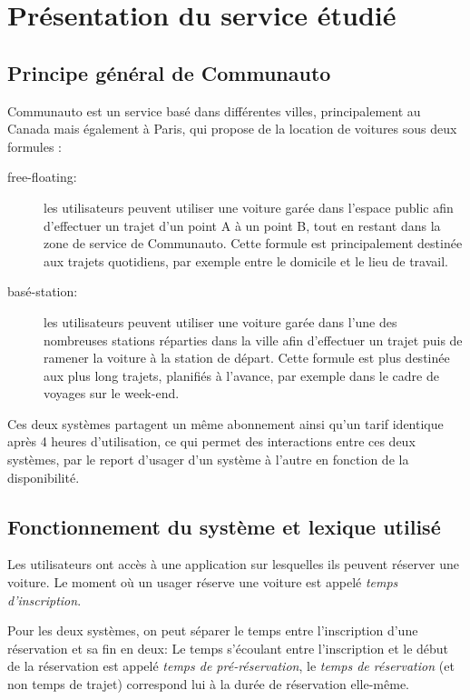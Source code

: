 \documentclass[12pt,a4paper]{article}
\author{Florian VERDIER}
\newcommand{\1}[1]{\mathbbm{1}_{\{#1\}} }
\theoremstyle{definition}
\begin{document}
\section{Présentation du service étudié}
\subsection{Principe général de Communauto}
Communauto est un service basé dans différentes villes, principalement au Canada mais également à Paris, qui propose de la location de voitures sous deux formules :
\begin{description}
\item[free-floating:] les utilisateurs peuvent utiliser une voiture garée dans l'espace public afin d'effectuer un trajet d'un point A à un point B, tout en restant dans la zone de service de Communauto. Cette formule est principalement destinée aux trajets quotidiens, par exemple entre le domicile et le lieu de travail.
\item[basé-station:] les utilisateurs peuvent utiliser une voiture garée dans l'une des nombreuses stations réparties dans la ville afin d'effectuer un trajet puis de ramener la voiture à la station de départ. Cette formule est plus destinée aux plus long trajets, planifiés à l'avance, par exemple dans le cadre de voyages sur le week-end. 
\end{description}

Ces deux systèmes partagent un même abonnement ainsi qu'un tarif identique après 4 heures d'utilisation, ce qui permet des interactions entre ces deux systèmes, par le report d'usager d'un système à l'autre en fonction de la disponibilité.

\subsection{Fonctionnement du système et lexique utilisé}

Les utilisateurs ont accès à une application sur lesquelles ils peuvent réserver une voiture. Le moment où un usager réserve une voiture est appelé \emph{temps d'inscription}.

Pour les deux systèmes, on peut séparer le temps entre l'inscription d'une réservation et sa fin en deux: Le temps s'écoulant entre l'inscription et le début de la réservation est appelé \emph{temps de pré-réservation}, le \emph{temps de réservation} (et non temps de trajet) correspond lui à la durée de réservation elle-même.
\end{document}
